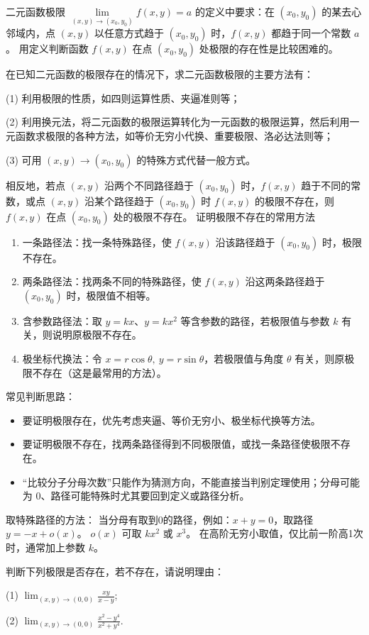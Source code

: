 \begin{note}
    二元函数极限 $\lim\limits_{(x,y)\to(x_0,y_0)} f(x,y) = a$ 的定义中要求：在 $(x_0,y_0)$ 的某去心邻域内，点 $(x,y)$ 以任意方式趋于 $(x_0,y_0)$ 时，$f(x,y)$ 都趋于同一个常数 $a$。
用定义判断函数 $f(x,y)$ 在点 $(x_0,y_0)$ 处极限的存在性是比较困难的。

在已知二元函数的极限存在的情况下，求二元函数极限的主要方法有：

(1) 利用极限的性质，如四则运算性质、夹逼准则等；

(2) 利用换元法，将二元函数的极限运算转化为一元函数的极限运算，然后利用一元函数求极限的各种方法，如等价无穷小代换、重要极限、洛必达法则等；

(3) 可用 $(x,y) \to (x_0,y_0)$ 的特殊方式代替一般方式。

相反地，若点 $(x,y)$ 沿两个不同路径趋于 $(x_0,y_0)$ 时，$f(x,y)$ 趋于不同的常数，或点 $(x,y)$ 沿某个路径趋于 $(x_0,y_0)$ 时 $f(x,y)$ 的极限不存在，则 $f(x,y)$ 在点 $(x_0,y_0)$ 处的极限不存在。
证明极限不存在的常用方法
\begin{enumerate}
    \item 一条路径法：找一条特殊路径，使 $f(x,y)$ 沿该路径趋于 $(x_0,y_0)$ 时，极限不存在。
    \item 两条路径法：找两条不同的特殊路径，使 $f(x,y)$ 沿这两条路径趋于 $(x_0,y_0)$ 时，极限值不相等。
    \item 含参数路径法：取 $y=kx$、$y=kx^2$ 等含参数的路径，若极限值与参数 $k$ 有关，则说明原极限不存在。
    \item 极坐标代换法：令 $x=r\cos\theta,\ y=r\sin\theta$，若极限值与角度 $\theta$ 有关，则原极限不存在（这是最常用的方法）。
\end{enumerate}
常见判断思路：
\begin{itemize}
    \item 要证明极限存在，优先考虑夹逼、等价无穷小、极坐标代换等方法。
    \item 要证明极限不存在，找两条路径得到不同极限值，或找一条路径使极限不存在。
    \item “比较分子分母次数”只能作为猜测方向，不能直接当判别定理使用；分母可能为 $0$、路径可能特殊时尤其要回到定义或路径分析。
\end{itemize}
取特殊路径的方法：
当分母有取到0的路径，例如：$x+y=0$，取路径 $y = -x + o(x)$。
$o(x)$ 可取 $kx^2$ 或 $x^3$。
在高阶无穷小取值，仅比前一阶高1次时，通常加上参数 $k$。
\end{note}
\begin{problem}
    判断下列极限是否存在，若不存在，请说明理由：

(1) $\displaystyle \lim_{(x,y)\to(0,0)} \frac{xy}{x-y}$;

(2) $\displaystyle \lim_{(x,y)\to(0,0)} \frac{x^2 - y^4}{x^2 + y^4}$.
\end{problem}
